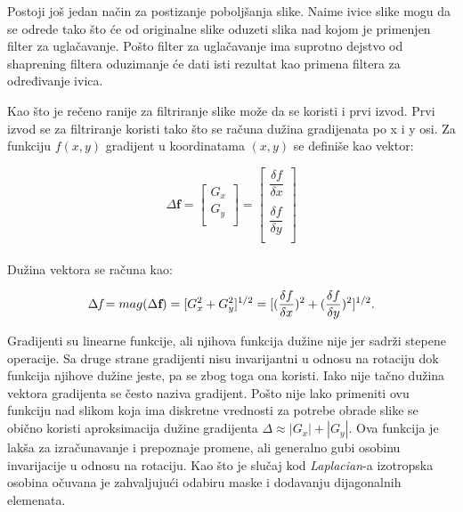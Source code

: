 \documentclass[a4paper,12pt,titlepage]{article}
\begin{document}
Postoji još jedan način za postizanje poboljšanja slike. Naime ivice slike mogu da se odrede tako što će od originalne slike oduzeti slika nad kojom je primenjen filter za uglačavanje. Pošto filter za uglačavanje ima suprotno dejstvo od shaprening filtera oduzimanje će dati isti rezultat kao primena filtera za određivanje ivica. 

Kao što je rečeno ranije za filtriranje slike može da se koristi i prvi izvod. Prvi izvod se za filtriranje koristi tako što se računa dužina gradijenata po x i y osi. Za funkciju $f(x, y)$ gradijent u koordinatama $(x, y)$ se definiše kao vektor:

\begin{equation}\label{eq:grad11}
\Delta \textbf{f}
=
\begin{bmatrix}
     G_{x} \\
     G_{y} \\
\end{bmatrix}
=
\begin{bmatrix}
     \dfrac{\delta f}{\delta x} \\
     \\
     \dfrac{\delta f}{\delta y} \\
\end{bmatrix}
\end{equation}\\

Dužina vektora se računa kao: 

\begin{equation}\label{eq:grad12}
	\Delta \emph{f} = mag(\Delta \textbf{f}) = [G_{x}^{2} + G_{y}^{2}]^{1/2} = [ (\dfrac{\delta f}{\delta x})^{2} +  (\dfrac{\delta f}{\delta y})^{2} ]^{1/2}. 
\end{equation}

Gradijenti su linearne funkcije, ali njihova funkcija dužine nije jer sadrži stepene operacije. Sa druge strane gradijenti nisu invarijantni u odnosu na rotaciju dok funkcija njihove dužine jeste, pa se zbog toga ona koristi. Iako nije tačno dužina vektora gradijenta se često naziva gradijent. Pošto nije lako primeniti ovu funkciju nad slikom koja ima diskretne vrednosti za potrebe obrade slike se obično koristi aproksimacija dužine gradijenta $\Delta \approx |G_{x}| + |G_{y}|$. Ova funkcija je lakša za izračunavanje i prepoznaje promene, ali generalno gubi osobinu invarijacije u odnosu na rotaciju. Kao što je slučaj kod \emph{Laplacian}-a izotropska osobina očuvana je zahvaljujući odabiru maske i dodavanju dijagonalnih elemenata. 
\end{document}
